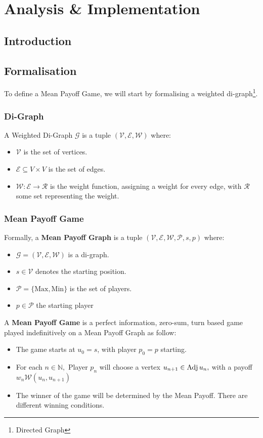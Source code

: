 \chapter{Analysis \& Implementation}
\section{Introduction}

\section{Formalisation}
To define a Mean Payoff Game, we will start by formalising a weighted di-graph\footnote{Directed Graph}.

\subsection{Di-Graph}
A Weighted Di-Graph $\mathcal{G}$ is a tuple $(\mathcal{V},\mathcal{E},\mathcal{W})$ where:

\begin{itemize}
		\item $\mathcal{V}$ is the set of vertices.
		\item $\mathcal{E} \subseteq V\times V$ is the set of edges.
		\item $\mathcal{W}:\mathcal{E}\rightarrow \mathcal{R}$ is the weight function, assigning a weight for every edge, with $\mathcal{R}$ some set representing the weight.
\end{itemize}
\subsection{Mean Payoff Game}
Formally, a \textbf{Mean Payoff Graph} is a tuple $(\mathcal{V},\mathcal{E},\mathcal{W},\mathcal{P},s,p)$ where:
\begin{itemize}
	\item $\mathcal{G}=(\mathcal{V},\mathcal{E},\mathcal{W})$ is a di-graph.
		\item $s\in \mathcal{V}$ denotes the starting position.
	\item $\mathcal{P}=\{\text{Max},\text{Min}\}$ is the set of players.
	\item $p\in \mathcal{P}$ the starting player
\end{itemize}


A  \textbf{Mean Payoff Game} is a perfect information, zero-sum, turn based game played indefinitively on a Mean Payoff Graph as follow:
\begin{itemize}
\item The game starts at $u_0=s$, with player $p_0=p$ starting.
\item For each $n\in\mathbb{N},$ Player $p_n$ will choose a vertex $u_{n+1}\in \operatorname{Adj} u_n,$ with a payoff $w_n\mathcal{W}(u_n,u_{n+1})$
\item The winner of the game will be determined by the Mean Payoff. There are different winning conditions.
\end{itemize}

